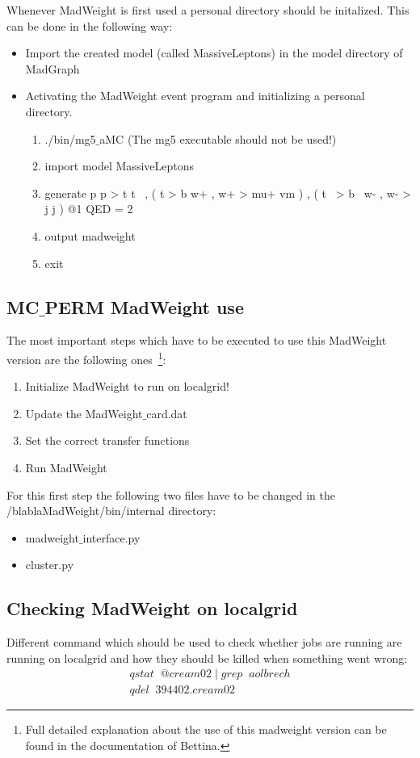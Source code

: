 \documentclass[a4paper,12pt]{report}
\begin{document}
Whenever MadWeight is first used a personal directory should be initalized. This can be done in the following way:
\begin{itemize}
  \item Import the created model (called MassiveLeptons) in the model directory of MadGraph
  \item Activating the MadWeight event program and initializing a personal directory.
  \begin{enumerate}
    \item ./bin/mg5$\_$aMC (The mg5 executable should not be used!)
    \item import model MassiveLeptons
    \item generate p p > t t~ , ( t > b w+ , w+ > mu+ vm ) , ( t~ > b~ w- , w- > j j ) @1 QED = 2 
    \item output madweight
    \item exit
  \end{enumerate}
\end{itemize}

\subsection{MC$\_$PERM MadWeight use}
The most important steps which have to be executed to use this MadWeight version are the following ones~\footnote{Full detailed explanation about the use of this madweight version can be found in the documentation of Bettina.}:
\begin{enumerate}
  \item Initialize MadWeight to run on localgrid!
  \item Update the MadWeight$\_$card.dat
  \item Set the correct transfer functions
  \item Run MadWeight
\end{enumerate}

For this first step the following two files have to be changed in the /blablaMadWeight/bin/internal directory:
\begin{itemize}
  \item madweight$\_$interface.py
  \item cluster.py
\end{itemize}

\subsection{Checking MadWeight on localgrid}
Different command which should be used to check whether jobs are running are running on localgrid and how they should be killed when something went wrong:
\begin{eqnarray}
 qstat \; \; @cream02 \; | \; grep \; \; aolbrech \\
 qdel \; \; 394402.cream02
\end{eqnarray}
\end{document}
